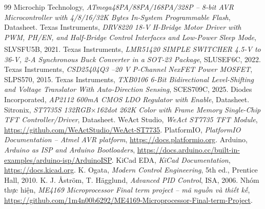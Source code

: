 \begingroup
\makeatletter\let\chapter\@gobbletwo\makeatother
\begin{thebibliography}{99}
 Microchip Technology, \emph{ATmega48PA/88PA/168PA/328P -- 8-bit AVR Microcontroller with 4/8/16/32K Bytes In-System Programmable Flash}, Datasheet.
 Texas Instruments, \emph{DRV8220 18-V H-Bridge Motor Driver with PWM, PH/EN, and Half-Bridge Control Interfaces and Low-Power Sleep Mode}, SLVSFU5B, 2021.
 Texas Instruments, \emph{LMR51420 SIMPLE SWITCHER\textsuperscript{\textregistered} 4.5-V to 36-V, 2-A Synchronous Buck Converter in a SOT-23 Package}, SLUSEF6C, 2022.
 Texas Instruments, \emph{CSD25404Q3 --20 V P-Channel NexFET\texttrademark{} Power MOSFET}, SLPS570, 2015.
 Texas Instruments, \emph{TXB0106 6-Bit Bidirectional Level-Shifting and Voltage Translator With Auto-Direction Sensing}, SCES709C, 2025.
 Diodes Incorporated, \emph{AP2112 600mA CMOS LDO Regulator with Enable}, Datasheet.
 Sitronix, \emph{ST7735S 132RGB$\times$162dot 262K Color with Frame Memory Single-Chip TFT Controller/Driver}, Datasheet.
 WeAct Studio, \emph{WeAct ST7735 TFT Module}, \url{https://github.com/WeActStudio/WeAct-ST7735}.
 PlatformIO, \emph{PlatformIO Documentation -- Atmel AVR platform}, \url{https://docs.platformio.org}.
 Arduino, \emph{Arduino as ISP and Arduino Bootloaders}, \url{https://docs.arduino.cc/built-in-examples/arduino-isp/ArduinoISP}.
 KiCad EDA, \emph{KiCad Documentation}, \url{https://docs.kicad.org}.
 K. Ogata, \emph{Modern Control Engineering}, 5th ed., Prentice Hall, 2010.
 K. J. Åström, T. Hägglund, \emph{Advanced PID Control}, ISA, 2006.
 Nhóm thực hiện, \emph{ME4169 Microprocessor Final term project -- mã nguồn và thiết kế}, \url{https://github.com/1m4n00b6292/ME4169-Microprocessor-Final-term-Project}.
\end{thebibliography}
\endgroup
